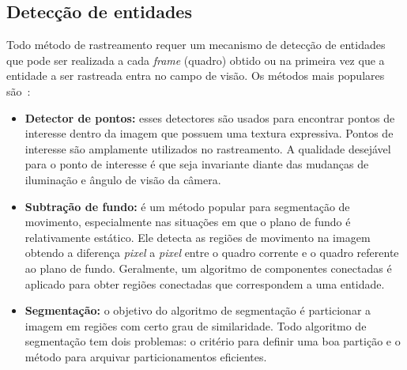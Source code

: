 \subsection{Detecção de entidades}
\label{sec:deteccao-objeto}

	Todo método de rastreamento requer um mecanismo de detecção de entidades que
	pode ser realizada a cada \textit{frame} (quadro) obtido ou na primeira vez que a
	entidade a ser rastreada entra no campo de visão. Os métodos mais populares são~\cite{yilmaz, shi,weiming}:


	\begin{itemize}
		\item \textbf{Detector de pontos:} esses detectores são usados para encontrar
		pontos de interesse dentro da imagem que possuem uma textura expressiva. Pontos de interesse são amplamente utilizados no rastreamento. 
		A qualidade desejável para o ponto de interesse é
		que seja invariante diante das mudanças de iluminação e ângulo de visão da
		câmera.
			
		\item \textbf{Subtração de fundo:} é um método popular para segmentação de
		movimento, especialmente nas situações em que o plano de fundo é relativamente
		estático. Ele detecta as regiões de movimento na imagem obtendo a diferença
		\textit{pixel} a \textit{pixel} entre o quadro corrente e o
		quadro referente ao plano de fundo. Geralmente, um
		algoritmo de componentes conectadas é aplicado para obter regiões conectadas que
		correspondem a uma entidade.
		
		\item \textbf{Segmentação:} o objetivo do algoritmo de segmentação é particionar
		a imagem em regiões com certo grau de similaridade. Todo algoritmo de
		segmentação tem dois problemas: o critério para definir uma boa partição e o
		método para arquivar particionamentos eficientes.

	\end{itemize}

